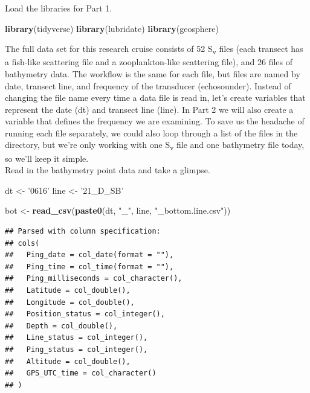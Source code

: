 \documentclass[]{article}
\newenvironment{Shaded}{\begin{snugshade}}{\end{snugshade}}
\newcommand{\KeywordTok}[1]{\textcolor[rgb]{0.13,0.29,0.53}{\textbf{#1}}}
\newcommand{\NormalTok}[1]{#1}
\newcommand{\StringTok}[1]{\textcolor[rgb]{0.31,0.60,0.02}{#1}}
\begin{document}
Load the libraries for Part 1.

\begin{Shaded}
\begin{Highlighting}[]
\KeywordTok{library}\NormalTok{(tidyverse)}
\KeywordTok{library}\NormalTok{(lubridate)}
\KeywordTok{library}\NormalTok{(geosphere)}
\end{Highlighting}
\end{Shaded}

The full data set for this research cruise consists of 52
S\textsubscript{v} files (each transect has a fish-like scattering file
and a zooplankton-like scattering file), and 26 files of bathymetry
data. The workflow is the same for each file, but files are named by
date, transect line, and frequency of the transducer (echosounder).
Instead of changing the file name every time a data file is read in,
let's create variables that represent the date (dt) and transect line
(line). In Part 2 we will also create a variable that defines the
frequency we are examining. To save us the headache of running each file
separately, we could also loop through a list of the files in the
directory, but we're only working with one S\textsubscript{v} file and
one bathymetry file today, so we'll keep it simple.\\

Read in the bathymetry point data and take a glimpse.

\begin{Shaded}
\begin{Highlighting}[]
\NormalTok{dt <-}\StringTok{ '0616'}
\NormalTok{line <-}\StringTok{ '21_D_SB'}

\NormalTok{bot <-}\StringTok{ }\KeywordTok{read_csv}\NormalTok{(}\KeywordTok{paste0}\NormalTok{(dt, }\StringTok{"_"}\NormalTok{, line, }\StringTok{"_bottom.line.csv"}\NormalTok{))}
\end{Highlighting}
\end{Shaded}

\begin{verbatim}
## Parsed with column specification:
## cols(
##   Ping_date = col_date(format = ""),
##   Ping_time = col_time(format = ""),
##   Ping_milliseconds = col_character(),
##   Latitude = col_double(),
##   Longitude = col_double(),
##   Position_status = col_integer(),
##   Depth = col_double(),
##   Line_status = col_integer(),
##   Ping_status = col_integer(),
##   Altitude = col_double(),
##   GPS_UTC_time = col_character()
## )
\end{verbatim}
\end{document}
